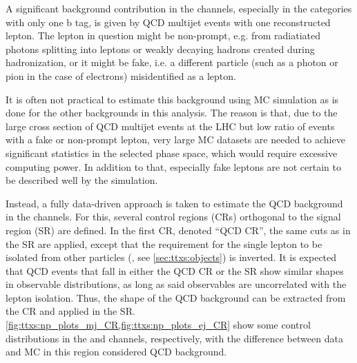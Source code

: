 A significant background contribution in the \ljets channels, especially in the categories with only one b tag, is given by QCD multijet events with one reconstructed lepton. The lepton in question might be non-prompt, e.g. from radiatiated photons splitting into leptons or weakly decaying hadrons created during hadronization, or it might be fake, i.e. a different particle (such as a photon or pion in the case of electrons) misidentified as a lepton.

It is often not practical to estimate this background using MC simulation as is done for the other backgrounds in this analysis. The reason is that, due to the large cross section of QCD multijet events at the LHC but low ratio of events with a fake or non-prompt lepton, very large MC datasets are needed to achieve significant statistics in the selected phase space, which would require excessive computing power. In addition to that, especially fake leptons are not certain to be described well by the simulation.

Instead, a fully data-driven approach is taken to estimate the QCD background in the \ljets channels. For this, several control regions (CRs) orthogonal to the signal region (SR) are defined. In the first CR, denoted ``QCD CR'', the same cuts as in the SR are applied, except that the requirement for the single lepton to be isolated from other particles (\Irel, see \cref{sec:ttxs:objects}) is inverted. It is expected that QCD events that fall in either the QCD CR or the SR show similar shapes in observable distributions, as long as said observables are uncorrelated with the lepton isolation. Thus, the shape of the QCD background can be extracted from the CR and applied in the SR. \cref{fig:ttxs:np_plots_mj_CR,fig:ttxs:np_plots_ej_CR} show some control distributions in the \mujets and \ejets channels, respectively, with the difference between data and MC in this region considered QCD background.


